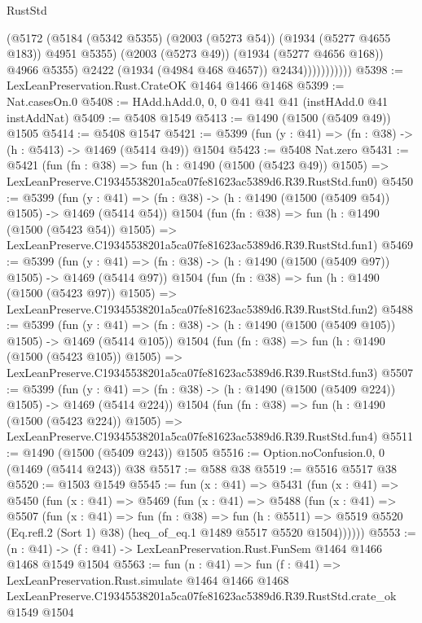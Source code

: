 \begin{lexlean}{RustStd}
\begin{coremodule}
                          (@5172
                            (@5184
                              (@5342 @5355)
                              (@2003 (@5273 @54))
                              (@1934 (@5277 @4655 @183))
                              @4951
                              @5355)
                            (@2003 (@5273 @49))
                            (@1934 (@5277 @4656 @168))
                            @4966
                            @5355)
                          @2422
                          (@1934 (@4984 @468 @4657))
                          @2434)))))))))))
@5398 := LexLeanPreservation.Rust.CrateOK @1464 @1466 @1468
@5399 := Nat.casesOn.{0}
@5408 := HAdd.hAdd.{0, 0, 0} @41 @41 @41 (instHAdd.{0} @41 instAddNat)
@5409 := @5408 @1549
@5413 := @1490 (@1500 (@5409 @49)) @1505
@5414 := @5408 @1547
@5421 := @5399 (fun (y : @41) => (fn : @38) -> (h : @5413) -> @1469 (@5414 @49)) @1504
@5423 := @5408 Nat.zero
@5431 := @5421
    (fun (fn : @38) =>
    fun (h : @1490 (@1500 (@5423 @49)) @1505) =>
    LexLeanPreserve.C19345538201a5ca07fe81623ac5389d6.R39.RustStd.fun0)
@5450 := @5399
    (fun (y : @41) => (fn : @38) -> (h : @1490 (@1500 (@5409 @54)) @1505) -> @1469 (@5414 @54))
    @1504
    (fun (fn : @38) =>
    fun (h : @1490 (@1500 (@5423 @54)) @1505) =>
    LexLeanPreserve.C19345538201a5ca07fe81623ac5389d6.R39.RustStd.fun1)
@5469 := @5399
    (fun (y : @41) => (fn : @38) -> (h : @1490 (@1500 (@5409 @97)) @1505) -> @1469 (@5414 @97))
    @1504
    (fun (fn : @38) =>
    fun (h : @1490 (@1500 (@5423 @97)) @1505) =>
    LexLeanPreserve.C19345538201a5ca07fe81623ac5389d6.R39.RustStd.fun2)
@5488 := @5399
    (fun (y : @41) => (fn : @38) -> (h : @1490 (@1500 (@5409 @105)) @1505) -> @1469 (@5414 @105))
    @1504
    (fun (fn : @38) =>
    fun (h : @1490 (@1500 (@5423 @105)) @1505) =>
    LexLeanPreserve.C19345538201a5ca07fe81623ac5389d6.R39.RustStd.fun3)
@5507 := @5399
    (fun (y : @41) => (fn : @38) -> (h : @1490 (@1500 (@5409 @224)) @1505) -> @1469 (@5414 @224))
    @1504
    (fun (fn : @38) =>
    fun (h : @1490 (@1500 (@5423 @224)) @1505) =>
    LexLeanPreserve.C19345538201a5ca07fe81623ac5389d6.R39.RustStd.fun4)
@5511 := @1490 (@1500 (@5409 @243)) @1505
@5516 := Option.noConfusion.{0, 0} (@1469 (@5414 @243)) @38
@5517 := @588 @38
@5519 := @5516 @5517 @38
@5520 := @1503 @1549
@5545 := fun (x : @41) =>
  @5431
    (fun (x : @41) =>
    @5450
      (fun (x : @41) =>
      @5469
        (fun (x : @41) =>
        @5488
          (fun (x : @41) =>
          @5507
            (fun (x : @41) =>
            fun (fn : @38) =>
            fun (h : @5511) =>
            @5519 @5520 (Eq.refl.{2} (Sort 1) @38) (heq_of_eq.{1} @1489 @5517 @5520 @1504))))))
@5553 := (n : @41) -> (f : @41) -> LexLeanPreservation.Rust.FunSem @1464 @1466 @1468 @1549 @1504
@5563 := fun (n : @41) =>
  fun (f : @41) =>
  LexLeanPreservation.Rust.simulate
    @1464
    @1466
    @1468
    LexLeanPreserve.C19345538201a5ca07fe81623ac5389d6.R39.RustStd.crate_ok
    @1549
    @1504
\end{coremodule}
\end{lexlean}
